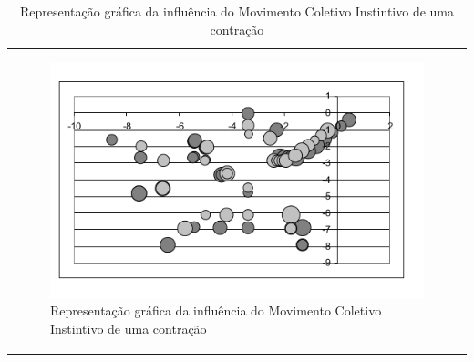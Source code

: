 \begin{table}[]
\centering
\caption{My caption}
\label{my-label}
\begin{tabular}{l}
\begin{figure}
	\caption{Representação gráfica da influência do Movimento Coletivo Instintivo de uma contração}
	\centering
	\includegraphics[scale=0.5]{images/movimento_volatil.png}
\end{figure} 
\end{tabular}
\end{table}